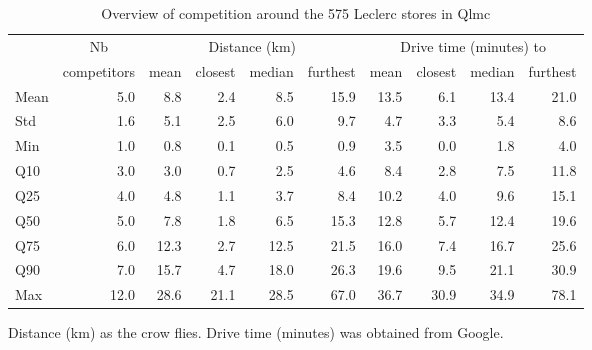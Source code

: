 \documentclass[english]{article}
\begin{document}
\begin{table}[htbp]
\begin{threeparttable}
\caption{Overview of competition around the 575 Leclerc stores in Qlmc}
\label{tab:qlmc_comp}
\begin{tabular}{lr|rrrr|rrrr}
    \toprule
    \toprule
          & \multicolumn{1}{c|}{Nb} & \multicolumn{4}{c|}{Distance (km)} & \multicolumn{4}{c}{Drive time (minutes) to} \\
          & \multicolumn{1}{c|}{competitors} & \multicolumn{1}{c}{mean} & \multicolumn{1}{c}{closest} & \multicolumn{1}{c}{median} & \multicolumn{1}{c|}{furthest} & \multicolumn{1}{c}{mean} & \multicolumn{1}{c}{closest} & \multicolumn{1}{c}{median} & \multicolumn{1}{c}{furthest} \\
    \midrule
    Mean  & 5.0   & 8.8   & 2.4   & 8.5   & 15.9  & 13.5  & 6.1   & 13.4  & 21.0 \\
    Std   & 1.6   & 5.1   & 2.5   & 6.0   & 9.7   & 4.7   & 3.3   & 5.4   & 8.6 \\
    Min   & 1.0   & 0.8   & 0.1   & 0.5   & 0.9   & 3.5   & 0.0   & 1.8   & 4.0 \\
    Q10   & 3.0   & 3.0   & 0.7   & 2.5   & 4.6   & 8.4   & 2.8   & 7.5   & 11.8 \\
    Q25   & 4.0   & 4.8   & 1.1   & 3.7   & 8.4   & 10.2  & 4.0   & 9.6   & 15.1 \\
    Q50   & 5.0   & 7.8   & 1.8   & 6.5   & 15.3  & 12.8  & 5.7   & 12.4  & 19.6 \\
    Q75   & 6.0   & 12.3  & 2.7   & 12.5  & 21.5  & 16.0  & 7.4   & 16.7  & 25.6 \\
    Q90   & 7.0   & 15.7  & 4.7   & 18.0  & 26.3  & 19.6  & 9.5   & 21.1  & 30.9 \\
    Max   & 12.0  & 28.6  & 21.1  & 28.5  & 67.0  & 36.7  & 30.9  & 34.9  & 78.1 \\
    \bottomrule
    \bottomrule
\end{tabular}
\begin{tablenotes}
\small
\item Distance (km) as the crow flies. Drive time (minutes) was obtained from Google.
\end{tablenotes}
\end{threeparttable}
\end{table}
\end{document}
